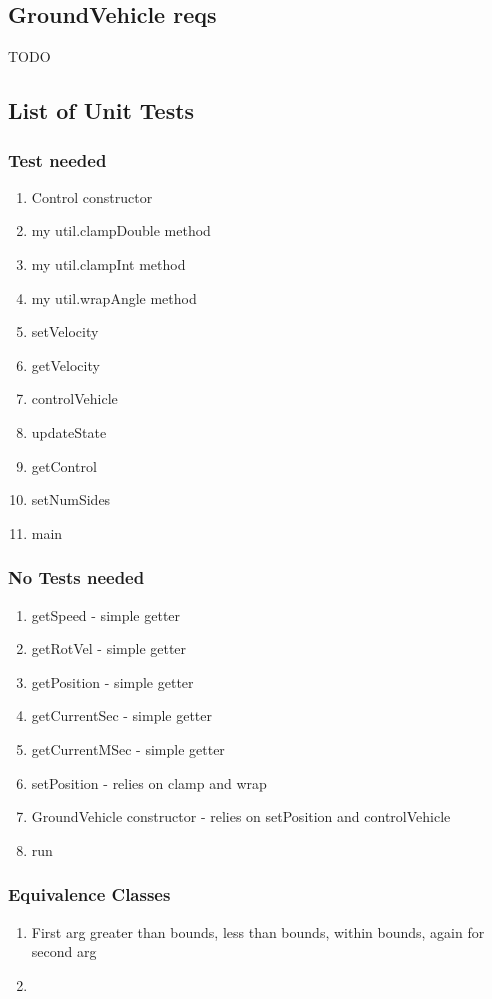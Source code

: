 \documentclass{article}
\begin{document}
\subsection{GroundVehicle reqs}
TODO
\subsection{List of Unit Tests}
\subsubsection{Test needed}
\begin{enumerate}
	\item Control constructor
	\item my util.clampDouble method
	\item my util.clampInt method
	\item my util.wrapAngle method
	\item setVelocity
	\item getVelocity
	\item controlVehicle
	\item updateState
	\item getControl
	\item setNumSides
	\item main
\end{enumerate}
\subsubsection{No Tests needed}
\begin{enumerate}
	\item getSpeed - simple getter
	\item getRotVel - simple getter
	\item getPosition - simple getter
	\item getCurrentSec - simple getter
	\item getCurrentMSec - simple getter
	\item setPosition - relies on clamp and wrap 
	\item GroundVehicle constructor - relies on setPosition and controlVehicle
	\item run
\end{enumerate}
\subsubsection{Equivalence Classes}
\begin{enumerate}
	\item First arg greater than bounds, less than bounds, within bounds, again for second arg
	\item 
\end{enumerate}
\end{document}
